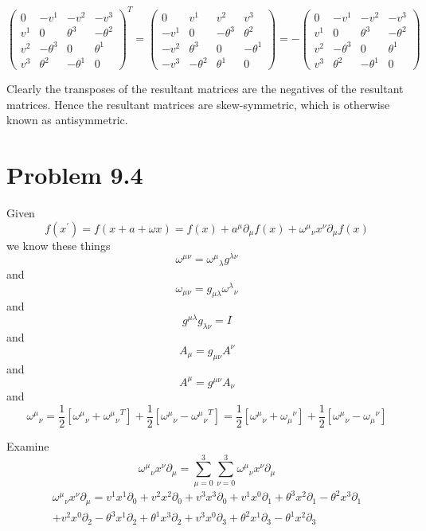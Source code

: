 \documentclass{article}
\begin{document}
\[\begin{pmatrix}0&-v^1&-v^2&-v^3\\v^1&0&\theta^3&-\theta^2\\v^2&-\theta^3&0&\theta^1\\v^3&\theta^2&-\theta^1&0\end{pmatrix}^T=\begin{pmatrix}0&v^1&v^2&v^3\\-v^1&0&-\theta^3&\theta^2\\-v^2&\theta^3&0&-\theta^1\\-v^3&-\theta^2&\theta^1&0\end{pmatrix}=-\begin{pmatrix}0&-v^1&-v^2&-v^3\\v^1&0&\theta^3&-\theta^2\\v^2&-\theta^3&0&\theta^1\\v^3&\theta^2&-\theta^1&0\end{pmatrix}\]

Clearly the transposes of the resultant matrices are the negatives of the resultant matrices. Hence the resultant matrices are skew-symmetric, which is otherwise known as antisymmetric.


 
\section*{Problem 9.4}

Given \[ f(x^\prime) = f(x+a+\omega x) = f(x)+a^\mu \partial_\mu f(x)+{\omega^\mu}_\nu x^\nu \partial_\mu f(x)\] we know these things \[\omega^{\mu\nu}={\omega^\mu}_\lambda g^{\lambda\nu} \] and \[\omega_{\mu\nu}= g_{\mu\lambda} {\omega^\lambda}_\nu \] and \[g^{\mu\lambda}g_{\lambda\nu} = I\] and \[A_\mu=g_{\mu\nu}A^\nu\] and \[A^\mu=g^{\mu\nu}A_\nu\] and \[{\omega^\mu}_\nu=\frac{1}{2}[{\omega^\mu}_\nu+{{\omega^\mu}_\nu}^T]+\frac{1}{2}[{\omega^\mu}_\nu-{{\omega^\mu}_\nu}^T]=\frac{1}{2}[{\omega^\mu}_\nu+{\omega_\mu}^\nu]+\frac{1}{2}[{\omega^\mu}_\nu-{\omega_\mu}^\nu]\]

Examine \[{\omega^\mu}_\nu x^\nu \partial_\mu=\sum^3_{\mu=0}\sum^3_{\nu=0}{\omega^\mu}_\nu x^\nu \partial_\mu\]
\begin{multline*}
{\omega^\mu}_\nu x^\nu \partial_\mu=
v^1 x^1 \partial_0+v^2 x^2 \partial_0+v^3 x^3 \partial_0+
v^1 x^0 \partial_1+\theta^3 x^2 \partial_1-\theta^2 x^3 \partial_1\\+ 
v^2 x^0 \partial_2-\theta^3 x^1 \partial_2+\theta^1 x^3 \partial_2+
v^3 x^0 \partial_3+\theta^2 x^1 \partial_3-\theta^1 x^2 \partial_3
\end{multline*}
\end{document}
